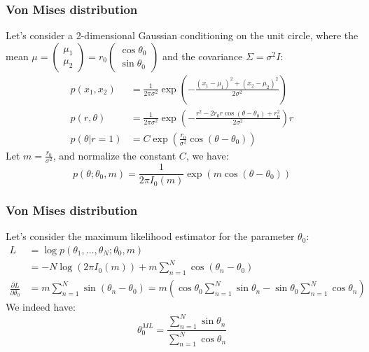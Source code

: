 \documentclass{beamer}
\begin{document}
\begin{frame}
    \frametitle{Von Mises distribution}
    Let's consider a 2-dimensional Gaussian conditioning on the unit circle, where the mean $\mu=\begin{pmatrix}
        \mu_{1}  \\
        \mu_{2}
    \end{pmatrix}=r_{0}
    \begin{pmatrix}
        \cos\theta_{0} \\
        \sin\theta_{0}
    \end{pmatrix}$ and the covariance $\Sigma=\sigma^{2}I$:
    \begin{align*}
        p(x_{1},x_{2})&=\frac{1}{2\pi\sigma^{2}}\exp(-\frac{(x_{1}-\mu_{1})^{2}+(x_{2}-\mu_{2})^{2}}{2\sigma^{2}}) \\
        p(r,\theta)&=\frac{1}{2\pi\sigma^{2}}\exp(-\frac{r^{2}-2r_{0}r\cos(\theta-\theta_{0})+r_{0}^{2}}{2\sigma^{2}})r \\
        p(\theta|r=1)&=C\exp(\frac{r_{0}}{\sigma^{2}}\cos(\theta-\theta_{0}))
    \end{align*}
    Let $m=\frac{r_{0}}{\sigma^{2}}$, and normalize the constant $C$, we have:
    \begin{equation*}
        p(\theta;\theta_{0},m)=\frac{1}{2\pi{}I_{0}(m)}\exp(m\cos(\theta-\theta_{0}))
    \end{equation*}
\end{frame}

\begin{frame}
    \frametitle{Von Mises distribution}
    Let's consider the maximum likelihood estimator for the parameter $\theta_{0}$:
    \begin{align*}
        L&=\log{}p(\theta_{1},\hdots,\theta_{N};\theta_{0},m) \\
        &=-N\log(2\pi{}I_{0}(m))+m\sum_{n=1}^{N}\cos(\theta_{n}-\theta_{0}) \\
        \frac{\partial{}L}{\partial\theta_{0}}&=m\sum_{n=1}^{N}\sin(\theta_{n}-\theta_{0})=m(\cos\theta_{0}\sum_{n=1}^{N}\sin\theta_{n}-\sin\theta_{0}\sum_{n=1}^{N}\cos\theta_{n})
    \end{align*}
    We indeed have:
    \begin{equation*}
        \theta_{0}^{ML}=\frac{\sum_{n=1}^{N}\sin\theta_{n}}{\sum_{n=1}^{N}\cos\theta_{n}}
    \end{equation*}
\end{frame}
\end{document}
